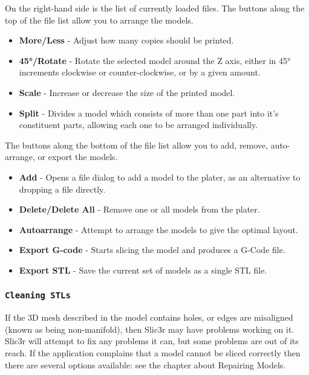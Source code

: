 On the right-hand side is the list of currently loaded files.  The buttons along the top of the file list allow you to arrange the models.
\begin{itemize}
	\item \textbf{More/Less}  - Adjust how many copies should be printed.
	\item \textbf{45°/Rotate}  - Rotate the selected model around the Z axis, either in 45° increments clockwise or counter-clockwise, or by a given amount.
	\item \textbf{Scale}  - Increase or decrease the size of the printed model.
	\item \textbf{Split}  - Divides a model which consists of more than one part into it's constituent parts, allowing each one to be arranged individually.
\end{itemize}

The buttons along the bottom of the file list allow you to add, remove, auto-arrange, or export the models.
\begin{itemize}
	\item \textbf{Add}  - Opens a file dialog to add a model to the plater, as an alternative to dropping a file directly.
	\item \textbf{Delete/Delete All}  - Remove one or all models from the plater.
	\item \textbf{Autoarrange}  - Attempt to arrange the models to give the optimal layout.
	\item \textbf{Export G-code}  - Starts slicing the model and produces a G-Code file.
	\item \textbf{Export STL}  - Save the current set of models as a single STL file.
\end{itemize}



\subsubsection{\texttt{Cleaning STLs}} %
\label{sub:cleaning_stls}
If the 3D mesh described in the model contains holes, or edges are misaligned (known as being non-manifold), then Slic3r may have problems working on it.  Slic3r will attempt to fix any problems it can, but some problems are out of its reach.  If the application complains that a model cannot be sliced correctly then there are several options available: see the chapter about Repairing Models.


